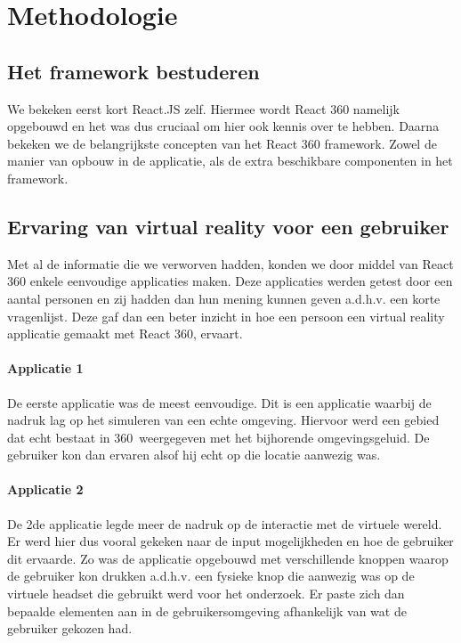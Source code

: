 
\chapter{Methodologie}
\label{ch:methodologie}


\section{Het framework bestuderen}
\label{sec:reactvr-bestuderen}
We bekeken eerst kort React.JS zelf. Hiermee wordt React 360 namelijk opgebouwd en het was dus cruciaal om hier ook kennis over te hebben. Daarna bekeken we de belangrijkste concepten van het React 360 framework. Zowel de manier van opbouw in de applicatie, als de extra beschikbare componenten in het framework.

\section{Ervaring van virtual reality voor een gebruiker}
\label{sec:ervaring-vr-app}
Met al de informatie die we verworven hadden, konden we door middel van React 360 enkele eenvoudige applicaties maken. Deze applicaties werden getest door een aantal personen en zij hadden dan hun mening kunnen geven a.d.h.v. een korte vragenlijst. Deze gaf dan een beter inzicht in hoe een persoon een virtual reality applicatie gemaakt met React 360, ervaart.

\subsubsection{Applicatie 1}
De eerste applicatie was de meest eenvoudige. Dit is een applicatie waarbij de nadruk lag op het simuleren van een echte omgeving. Hiervoor werd een gebied dat echt bestaat in 360\textdegree\ weergegeven met het bijhorende omgevingsgeluid. De gebruiker kon dan ervaren alsof hij echt op die locatie aanwezig was.

\subsubsection{Applicatie 2}
De 2de applicatie legde meer de nadruk op de interactie met de virtuele wereld. Er werd hier dus vooral gekeken naar de input mogelijkheden en hoe de gebruiker dit ervaarde. Zo was de applicatie opgebouwd met verschillende knoppen waarop de gebruiker kon drukken a.d.h.v. een fysieke knop die aanwezig was op de virtuele headset die gebruikt werd voor het onderzoek. Er paste zich dan bepaalde elementen aan in de gebruikersomgeving afhankelijk van wat de gebruiker gekozen had.

